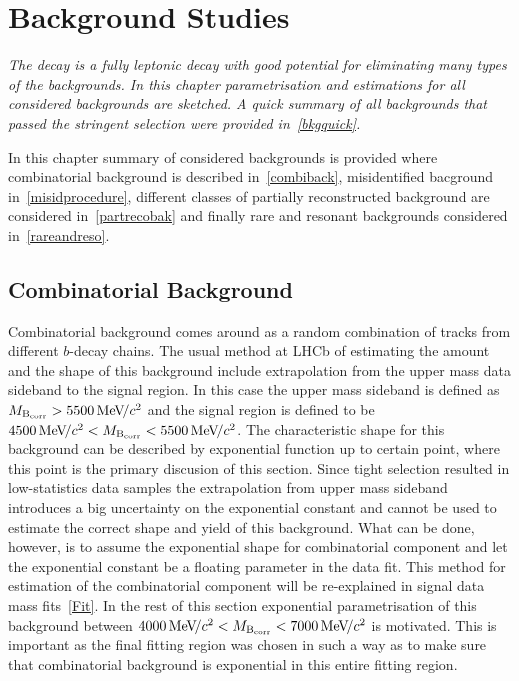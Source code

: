 \chapter{Background Studies}
\label{chap:back}

\textit{The decay \Bmumumu is a fully leptonic decay with good potential for eliminating many types of the backgrounds. In this chapter parametrisation and estimations for all considered backgrounds are sketched. A quick summary of all backgrounds that passed the stringent selection were provided in~\autoref{bkgquick}.}

In this chapter summary of considered backgrounds is provided where combinatorial background is described in~\autoref{combiback}, misidentified bacground in~\autoref{misidprocedure}, different classes of partially reconstructed background are considered in~\autoref{partrecobak} and finally rare and resonant backgrounds considered in~\autoref{rareandreso}.

\section{Combinatorial Background}
\label{combiback}
Combinatorial background comes around as a random combination of tracks from different $b$-decay chains. The usual method at \gls{LHCb} of estimating the amount and the shape of this background include extrapolation from the upper mass data sideband to the signal region. In this case the upper mass sideband is defined as $M_{\rm{B_{corr}}} > 5500 {\mathrm{\,Me\kern -0.1em V\!/}c^2}$ and the signal region is defined to be $ 4500 {\mathrm{\,Me\kern -0.1em V\!/}c^2} <M_{\rm{B_{corr}}} < 5500 {\mathrm{\,Me\kern -0.1em V\!/}c^2}$. The characteristic shape for this background can be described by exponential function up to certain point, where this point is the primary discusion of this section. Since tight selection resulted in low-statistics data samples the extrapolation from upper mass sideband introduces a big uncertainty on the exponential constant and cannot be used to estimate the correct shape and yield of this background. What can be done, however, is to assume the exponential shape for combinatorial component and let the exponential constant be a floating parameter in the data fit. This method for estimation of the combinatorial component will be re-explained in signal data mass fits~\autoref{Fit}. In the rest of this section exponential parametrisation of this background between $4000 {\mathrm{\,Me\kern -0.1em V\!/}c^2} <M_{\rm{B_{corr}}} < 7000 {\mathrm{\,Me\kern -0.1em V\!/}c^2}$ is motivated. This is important as the final fitting region was chosen in such a way as to make sure that combinatorial background is exponential in this entire fitting region. 

